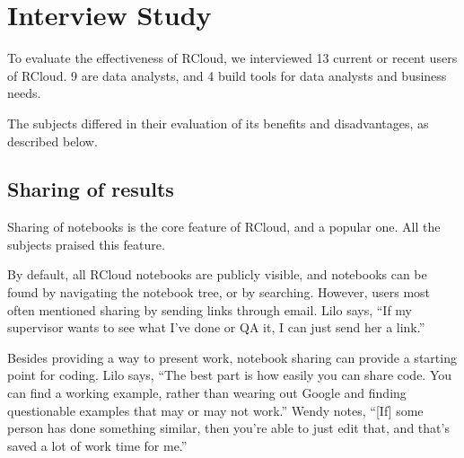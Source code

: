 \section{Interview Study\label{sec:interviews}}

To evaluate the effectiveness of RCloud, we interviewed 13 current or
recent users of RCloud. 9 are data analysts, and 4 build tools for data
analysts and business needs.

The subjects differed in their evaluation of its benefits and disadvantages,
as described below.


\subsection{Sharing of results}
Sharing of notebooks is the core feature of RCloud, and a popular one. All
the subjects praised this feature.


By default, all RCloud notebooks are publicly visible, and notebooks can be
found by navigating the notebook tree, or by searching. However, users most
often mentioned sharing by sending links through email. Lilo says,
``If my supervisor wants to see what I've done or QA it, I can just send her a link.''

Besides providing a way to present work, notebook sharing can provide a
starting point for coding. Lilo says, ``The best part is how easily you can
share code. You can find a working example, rather than wearing
out Google and finding questionable examples that may or may not work.'' Wendy
notes, ``[If] some person has done something similar, then you're able to just
edit that, and that's saved a lot of work time for me.''

